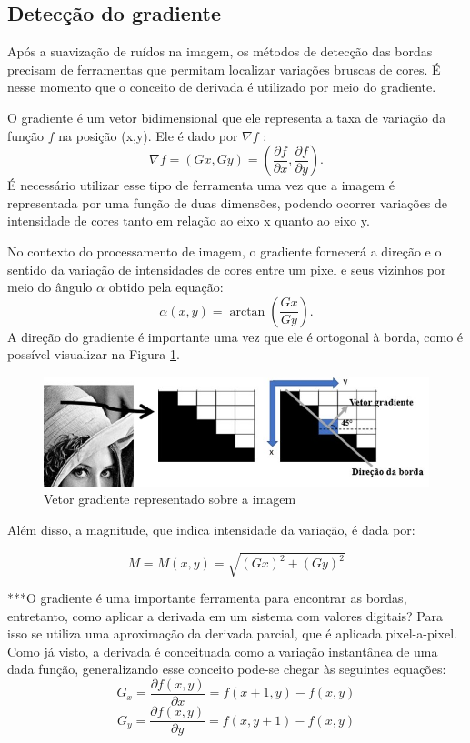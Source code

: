 \documentclass[a4paper,alpha-refs]{RBCA_v1.0}
\begin{document}
\subsection{Detecção do gradiente}

Após a suavização de ruídos na imagem, os métodos de detecção das bordas precisam de ferramentas que permitam localizar variações bruscas de cores. É nesse momento que o conceito de derivada é utilizado por meio do gradiente.

O gradiente é um vetor bidimensional que ele representa a taxa de variação da função $f$ na posição (x,y). Ele é dado por $\nabla f$ :
\begin{equation}
\nabla f = (Gx,Gy) = \left(\frac{\partial f}{\partial x},\frac{\partial f}{\partial y}\right).
\label{eq:gradiente}
\end{equation}
É necessário utilizar esse tipo de ferramenta uma vez que a imagem é representada por uma função de duas dimensões, podendo ocorrer variações de intensidade de cores tanto em relação ao eixo x quanto ao eixo y. 

No contexto do processamento de imagem, o gradiente fornecerá a direção e o sentido da variação de intensidades de cores entre um pixel e seus vizinhos por meio do ângulo $\alpha$ obtido pela equação: 
\begin{equation}
\alpha (x,y) = \arctan \left(\frac{Gx}{Gy}\right).
\label{eq:angulo}
\end{equation}
A direção do gradiente é importante uma vez que ele é ortogonal à borda, como é possível visualizar na Figura \ref{img:exemplo1}.
\begin{figure}[h!]
	\centering
	\includegraphics[width=.5\textwidth]{img/1-gradiente.jpg}
	\caption{Vetor gradiente representado sobre a imagem}
	\label{img:exemplo1}
\end{figure}

Além disso, a magnitude, que indica intensidade da variação, é dada por:

\begin{equation}
M = M(x,y) = \sqrt{(Gx)^2 + (Gy)^2} 
\label{eq:modulo}
\end{equation}

***O gradiente é uma importante ferramenta para encontrar as bordas, entretanto, como aplicar a derivada em um sistema com valores digitais? Para isso se utiliza uma aproximação da derivada parcial, que é aplicada pixel-a-pixel. Como já visto, a derivada é conceituada como a variação instantânea de uma dada função, generalizando esse conceito pode-se chegar às seguintes equações:
\begin{equation}
G_x = \frac{\partial f(x,y)}{\partial x} = f(x + 1,y) - f(x,y)
\label{eq:gradientex}	
\end{equation}
\begin{equation}
G_y = \frac{\partial f(x,y)}{\partial y} = f(x ,y+ 1) - f(x,y)
\label{eq:gradientey}
\end{equation}
\end{document}
